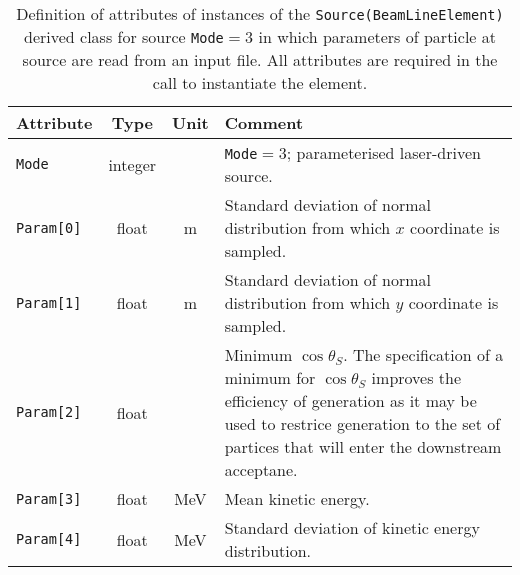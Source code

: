\begin{table}[h]
  \caption{
    Definition of attributes of instances of
    the \texttt{Source(BeamLineElement)} derived class for
    source \texttt{Mode}$=3$ in which parameters of particle at source
    are read from an input file.
    All attributes are required in the call to instantiate the
    element.
  }
  \label{Tab:Source:AttributesD}
  \begin{center}
    \begin{tabular}{|l|c|c|p{10cm}|}
      \hline
      \textbf{Attribute} & \textbf{Type}      & \textbf{Unit} & \textbf{Comment}                    \\
      \hline
      \texttt{Mode}      & integer &          & \texttt{Mode}$=3$; parameterised laser-driven source.        \\
      \hline
       \texttt{Param[0]} & float   & m        & Standard deviation of normal distribution from which $x$ coordinate is sampled. \\
       \texttt{Param[1]} & float   & m        & Standard deviation of normal distribution from which $y$ coordinate is sampled. \\
       \texttt{Param[2]} & float   &          & Minimum $\cos\theta_S$.
                                                The specification of a minimum for $\cos\theta_S$ improves the efficiency of
                                                generation as it may be used to restrice generation to the set of partices that
                                                will enter the downstream acceptane.                                            \\
       \texttt{Param[3]} & float   & MeV      & Mean kinetic energy.                                          \\
       \texttt{Param[4]} & float   & MeV      & Standard deviation of kinetic energy distribution.            \\
      \hline
    \end{tabular}
  \end{center}
\end{table}
